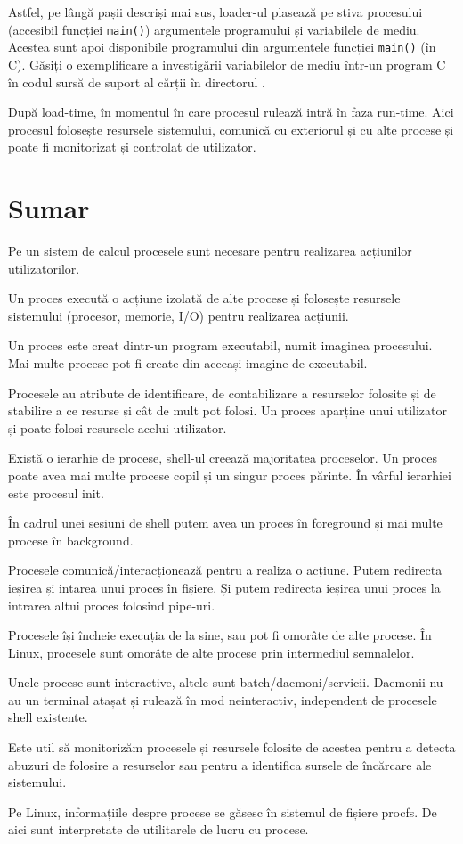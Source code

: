 Astfel, pe lângă pașii descriși mai sus, loader-ul plasează pe stiva procesului
(accesibil funcției \texttt{main()}) argumentele programului și variabilele de mediu.
Acestea sunt apoi disponibile programului din argumentele funcției \texttt{main()} (în C). Găsiți o exemplificare a investigării variabilelor de mediu într-un program C în codul sursă de suport al cărții în directorul .

După load-time, în momentul în care procesul rulează intră în faza run-time.
Aici procesul folosește resursele sistemului, comunică cu exteriorul și cu alte
procese și poate fi monitorizat și controlat de utilizator.

\section{Sumar}
\label{sec:procese-sumar}

Pe un sistem de calcul procesele sunt necesare pentru realizarea acțiunilor
utilizatorilor.

Un proces execută o acțiune izolată de alte procese și folosește resursele
sistemului (procesor, memorie, I/O) pentru realizarea acțiunii.

Un proces este creat dintr-un program executabil, numit imaginea procesului. Mai
multe procese pot fi create din aceeași imagine de executabil.

Procesele au atribute de identificare, de contabilizare a resurselor folosite și
de stabilire a ce resurse și cât de mult pot folosi. Un proces aparține unui
utilizator și poate folosi resursele acelui utilizator.

Există o ierarhie de procese, shell-ul creează majoritatea proceselor. Un proces
poate avea mai multe procese copil și un singur proces părinte. În vârful
ierarhiei este procesul init.

În cadrul unei sesiuni de shell putem avea un proces în foreground și mai multe
procese în background.

Procesele comunică/interacționează pentru a realiza o acțiune. Putem redirecta
ieșirea și intarea unui proces în fișiere. Și putem redirecta ieșirea unui
proces la intrarea altui proces folosind pipe-uri.

Procesele își încheie execuția de la sine, sau pot fi omorâte de alte procese.
În Linux, procesele sunt omorâte de alte procese prin intermediul semnalelor.

Unele procese sunt interactive, altele sunt batch/daemoni/servicii. Daemonii nu
au un terminal atașat și rulează în mod neinteractiv, independent de procesele
shell existente.

Este util să monitorizăm procesele și resursele folosite de acestea pentru a
detecta abuzuri de folosire a resurselor sau pentru a identifica sursele de
încărcare ale sistemului.

Pe Linux, informațiile despre procese se găsesc în sistemul de fișiere procfs. De
aici sunt interpretate de utilitarele de lucru cu procese.

